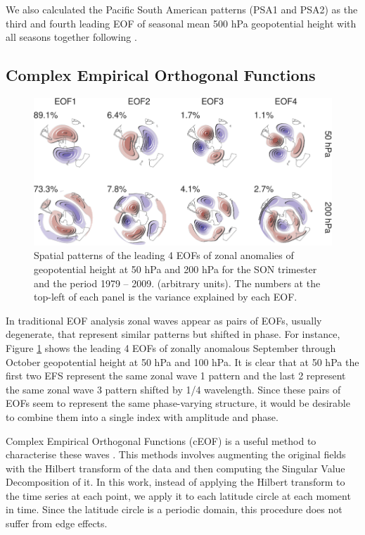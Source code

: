 \documentclass[smallextended]{svjour3}       %
\begin{document}
We also calculated the Pacific South American patterns (PSA1 and PSA2) as the third and fourth leading EOF of seasonal mean 500 hPa geopotential height with all seasons together following \citet{mo2001}.

\hypertarget{complex-empirical-orthogonal-functions}{%
\subsection{Complex Empirical Orthogonal Functions}\label{complex-empirical-orthogonal-functions}}



\begin{figure}
\centering
\includegraphics{../figures/eof-naive-1.pdf}
\caption{\label{fig:eof-naive}Spatial patterns of the leading 4 EOFs of zonal anomalies of geopotential height at 50 hPa and 200 hPa for the SON trimester and the period 1979 -- 2009. (arbitrary units). The numbers at the top-left of each panel is the variance explained by each EOF.}
\end{figure}

In traditional EOF analysis zonal waves appear as pairs of EOFs, usually degenerate, that represent similar patterns but shifted in phase. For instance, Figure \ref{fig:eof-naive} shows the leading 4 EOFs of zonally anomalous September through October geopotential height at 50 hPa and 100 hPa. It is clear that at 50 hPa the first two EFS represent the same zonal wave 1 pattern and the last 2 represent the same zonal wave 3 pattern shifted by 1/4 wavelength. Since these pairs of EOFs seem to represent the same phase-varying structure, it would be desirable to combine them into a single index with amplitude and phase.

Complex Empirical Orthogonal Functions (cEOF) is a useful method to characterise these waves \citep{horel1984}. This methods involves augmenting the original fields with the Hilbert transform of the data and then computing the Singular Value Decomposition of it. In this work, instead of applying the Hilbert transform to the time series at each point, we apply it to each latitude circle at each moment in time. Since the latitude circle is a periodic domain, this procedure does not suffer from edge effects.
\end{document}
